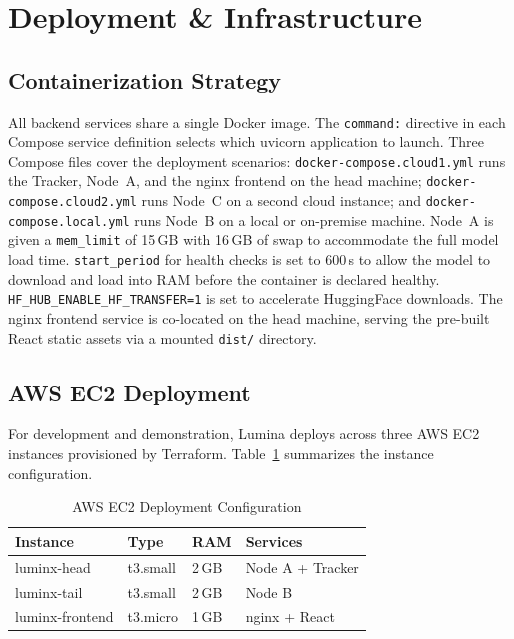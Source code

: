 \documentclass[conference]{IEEEtran}
\begin{document}
\section{Deployment \& Infrastructure}

\subsection{Containerization Strategy}

All backend services share a single Docker image. The \texttt{command:}
directive in each Compose service definition selects which uvicorn application
to launch. Three Compose files cover the deployment scenarios:
\texttt{docker-compose.cloud1.yml} runs the Tracker, Node~A, and the nginx
frontend on the head machine; \texttt{docker-compose.cloud2.yml} runs Node~C
on a second cloud instance; and \texttt{docker-compose.local.yml} runs Node~B
on a local or on-premise machine. Node~A is given a \texttt{mem\_limit} of
15\,GB with 16\,GB of swap to accommodate the full model load time.
\texttt{start\_period} for health checks is set to 600\,s to allow the model
to download and load into RAM before the container is declared healthy.
\texttt{HF\_HUB\_ENABLE\_HF\_TRANSFER=1} is set to accelerate HuggingFace
downloads. The nginx frontend service is co-located on the head machine,
serving the pre-built React static assets via a mounted \texttt{dist/}
directory.

\subsection{AWS EC2 Deployment}

For development and demonstration, Lumina deploys across three AWS EC2
instances provisioned by Terraform. Table~\ref{tab:ec2} summarizes the instance
configuration.

\begin{table}[htbp]
\centering
\caption{AWS EC2 Deployment Configuration}
\label{tab:ec2}
\begin{tabular}{llll}
\toprule
\textbf{Instance} & \textbf{Type} & \textbf{RAM} & \textbf{Services} \\
\midrule
luminx-head     & t3.small  & 2\,GB & Node A + Tracker \\
luminx-tail     & t3.small  & 2\,GB & Node B           \\
luminx-frontend & t3.micro  & 1\,GB & nginx + React    \\
\bottomrule
\end{tabular}
\end{table}
\end{document}
